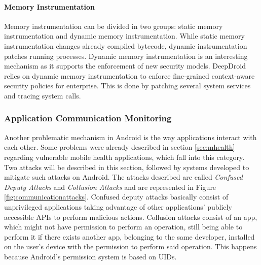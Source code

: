 \paragraph{\textbf{Memory Instrumentation}}
Memory instrumentation can be divided in two groups: static memory instrumentation and dynamic memory instrumentation. While static memory instrumentation changes already compiled bytecode, dynamic instrumentation patches running processes. Dynamic memory instrumentation is an interesting mechanism as it supports the enforcement of new security models. DeepDroid \cite{wang2015deepdroid} relies on dynamic memory instrumentation to enforce fine-grained context-aware security policies for enterprise. This is done by patching several system services and tracing system calls.\\ %

\subsubsection{Application Communication Monitoring}
\label{sec:appcommmonitoring}

Another problematic mechanism in Android is the way applications interact with each other. Some problems were already described in section \ref{sec:mhealth} regarding vulnerable mobile health applications, which fall into this category. Two attacks will be described in this section, followed by systems developed to mitigate such attacks on Android. The attacks described are called \emph{Confused Deputy Attacks} and \emph{Collusion Attacks} and are represented in Figure \ref{fig:communicationattacks}. Confused deputy attacks basically consist of unprivileged applications taking advantage of other applications’ publicly accessible APIs to perform malicious actions. Collusion attacks consist of an app, which might not have permission to perform an operation, still being able to perform it if there exists another app, belonging to the same developer, installed on the user’s device with the permission to perform said operation. This happens because Android’s permission system is based on UIDs.

